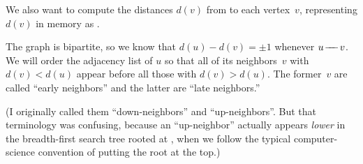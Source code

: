 We also want to compute the distances $d(v)$ from 
to
each vertex~$v$, representing $d(v)$ in memory as .

The graph is bipartite, so we know that $d(u)-d(v)=\pm1$ whenever $u\mathrel{\!\mathrel-\mkern-8mu\mathrel-\mkern-8mu\mathrel-\!} v$.
We will order the adjacency list of $u$ so that all of its neighbors~$v$ with
$d(v)<d(u)$ appear before all those with $d(v)>d(u)$. The former~$v$ are
called ``early neighbors'' and the latter are ``late neighbors.''

(I originally called them ``down-neighbors'' and ``up-neighbors''.
But that terminology was confusing, because an
``up-neighbor'' actually appears {\it lower\/} in the breadth-first
search tree rooted at , when we follow the typical
computer-science convention of putting the root at the top.)

